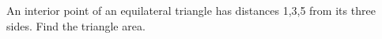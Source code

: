 An interior point of an equilateral triangle has distances 1,3,5 from its three sides. Find the triangle area.
